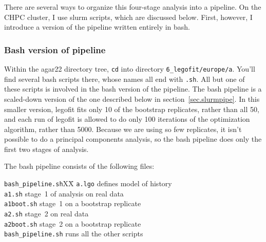 \documentclass[11pt]{article}
\newenvironment{leftindent}%
{\begin{list}{}%
         {\setlength{\leftmargin}{2em}}%
         \item[]%
}{\end{list}}
\begin{document}
There are several ways to organize this four-stage analysis into a
pipeline. On the CHPC cluster, I use slurm scripts, which are
discussed below. First, however, I introduce a version of the pipeline
written entirely in bash.

\subsubsection{Bash version of pipeline}
\label{sec.bashpipe}
Within the agar22 directory tree, \texttt{cd} into directory
\verb|6_legofit/europe/a|. You'll find several bash scripts there,
whose names all end with \texttt{.sh}. All but one of these scripts is
involved in the bash version of the pipeline. The bash pipeline is a
scaled-down version of the one described below in
section~\ref{sec.slurmpipe}. In this smaller version, legofit fits
only 10 of the bootstrap replicates, rather than all 50, and each run
of legofit is allowed to do only 100 iterations of the optimization
algorithm, rather than 5000. Because we are using so few replicates,
it isn't possible to do a principal components analysis, so the bash
pipeline does only the first two stages of analysis.

The bash pipeline consists of the following files:
\begin{leftindent}
\begin{tabbing}
\verb|bash_pipeline.sh|XX\=\kill
\texttt{a.lgo} \> defines model of history\\    
\texttt{a1.sh} \> stage~1 of analysis on real data\\
\texttt{a1boot.sh} \> stage~1 on a bootstrap replicate\\
\texttt{a2.sh} \> stage~2 on real data\\
\texttt{a2boot.sh} \> stage~2 on a bootstrap replicate\\
\verb|bash_pipeline.sh| \> runs all the other scripts
\end{tabbing}
\end{leftindent}
\end{document}
